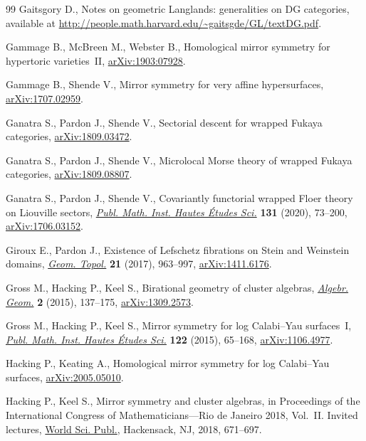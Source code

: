 \begin{thebibliography}{99}
Gaitsgory D., Notes on geometric {L}anglands: generalities on {DG} categories,
 available at \url{http://people.math.harvard.edu/~gaitsgde/GL/textDG.pdf}.

Gammage B., McBreen M., Webster B., Homological mirror symmetry for hypertoric
 varieties~{II}, \href{https://arxiv.org/abs/1903:07928}{arXiv:1903:07928}.

Gammage B., Shende V., Mirror symmetry for very affine hypersurfaces,
 \href{https://arxiv.org/abs/1707.02959}{arXiv:1707.02959}.

Ganatra S., Pardon J., Shende V., Sectorial descent for wrapped {F}ukaya
 categories, \href{https://arxiv.org/abs/1809.03472}{arXiv:1809.03472}.

Ganatra S., Pardon J., Shende V., Microlocal {M}orse theory of wrapped {Fukaya}
 categories, \href{https://arxiv.org/abs/1809.08807}{arXiv:1809.08807}.

Ganatra S., Pardon J., Shende V., Covariantly functorial wrapped {F}loer theory
 on {L}iouville sectors, \href{https://doi.org/10.1007/s10240-019-00112-x}{\textit{Publ. Math. Inst. Hautes \'Etudes Sci.}}
 \textbf{131} (2020), 73--200, \href{https://arxiv.org/abs/1706.03152}{arXiv:1706.03152}.


Giroux E., Pardon J., Existence of {L}efschetz fibrations on {S}tein and
 {W}einstein domains, \href{https://doi.org/10.2140/gt.2017.21.963}{\textit{Geom. Topol.}} \textbf{21} (2017), 963--997,
 \href{https://arxiv.org/abs/1411.6176}{arXiv:1411.6176}.

Gross M., Hacking P., Keel S., Birational geometry of cluster algebras,
 \href{https://doi.org/10.14231/AG-2015-007}{\textit{Algebr. Geom.}} \textbf{2} (2015), 137--175, \href{https://arxiv.org/abs/1309.2573}{arXiv:1309.2573}.

Gross M., Hacking P., Keel S., Mirror symmetry for log {C}alabi--{Y}au
 surfaces~{I}, \href{https://doi.org/10.1007/s10240-015-0073-1}{\textit{Publ. Math. Inst. Hautes \'Etudes Sci.}} \textbf{122}
 (2015), 65--168, \href{https://arxiv.org/abs/1106.4977}{arXiv:1106.4977}.

Hacking P., Keating A., Homological mirror symmetry for log {C}alabi--{Y}au
 surfaces, \href{https://arxiv.org/abs/2005.05010}{arXiv:2005.05010}.

Hacking P., Keel S., Mirror symmetry and cluster algebras, in Proceedings of
 the {I}nternational {C}ongress of {M}athematicians---{R}io de {J}aneiro 2018,
 {V}ol.~{II}. {I}nvited lectures, \href{https://doi.org/10.1142/11060}{World Sci. Publ.}, Hackensack, NJ, 2018,
 671--697.


\end{thebibliography}
